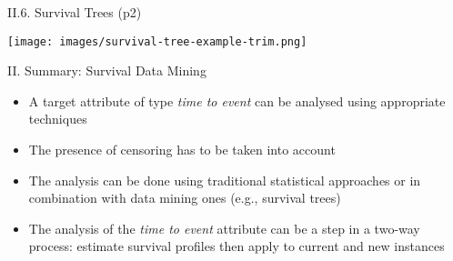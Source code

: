\documentclass[handout]{beamer}
\begin{document}
\begin{frame}{II.6. Survival Trees (p2)}
\begin{center}
\texttt{[image: images/survival-tree-example-trim.png]}
\end{center}
\end{frame}
\begin{frame}{II. Summary: Survival Data Mining}
\begin{itemize}
\item A target attribute of type \emph{time to event} can be analysed using appropriate techniques
\item The presence of censoring has to be taken into account
\item The analysis can be done using traditional statistical approaches or in combination with data mining ones (e.g., survival trees)
\item The analysis of the \emph{time to event} attribute can be a step in a two-way process: estimate survival profiles then apply to current and new instances
\end{itemize}
\end{frame}


\end{document}
